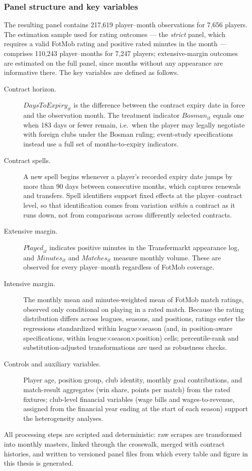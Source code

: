 \subsubsection*{Panel structure and key variables}

The resulting panel contains 217{,}619 player--month observations for
7{,}656 players. The estimation sample used for rating outcomes ---
the \emph{strict} panel, which requires a valid FotMob rating and
positive rated minutes in the month --- comprises 110{,}243
player--months for 7{,}247 players; extensive-margin outcomes are
estimated on the full panel, since months without any appearance are
informative there. The key variables are defined as follows.

\begin{description}
  \item[Contract horizon.] $\mathit{DaysToExpiry}_{it}$ is the
  difference between the contract expiry date in force and the
  observation month. The treatment indicator
  $\mathit{Bosman}_{it}$ equals one when 183 days or fewer remain,
  i.e.\ when the player may legally negotiate with foreign clubs
  under the Bosman ruling; event-study specifications instead use a
  full set of months-to-expiry indicators.

  \item[Contract spells.] A new spell begins whenever a player's
  recorded expiry date jumps by more than 90 days between consecutive
  months, which captures renewals and transfers. Spell identifiers
  support fixed effects at the player--contract level, so that
  identification comes from variation \emph{within} a contract as it
  runs down, not from comparisons across differently selected
  contracts.

  \item[Extensive margin.] $\mathit{Played}_{it}$ indicates positive
  minutes in the Transfermarkt appearance log, and
  $\mathit{Minutes}_{it}$ and $\mathit{Matches}_{it}$ measure monthly
  volume. These are observed for every player--month regardless of
  FotMob coverage.

  \item[Intensive margin.] The monthly mean and minutes-weighted mean
  of FotMob match ratings, observed only conditional on playing in a
  rated match. Because the rating distribution differs across
  leagues, seasons, and positions, ratings enter the regressions
  standardized within league$\times$season (and, in position-aware
  specifications, within league$\times$season$\times$position) cells;
  percentile-rank and substitution-adjusted transformations are used
  as robustness checks.

  \item[Controls and auxiliary variables.] Player age, position
  group, club identity, monthly goal contributions, and match-result
  aggregates (win share, points per match) from the rated fixtures;
  club-level financial variables (wage bills and wages-to-revenue,
  assigned from the financial year ending at the start of each
  season) support the heterogeneity analyses.
\end{description}

All processing steps are scripted and deterministic: raw scrapes are
transformed into monthly masters, linked through the crosswalk,
merged with contract histories, and written to versioned panel files
from which every table and figure in this thesis is generated.
